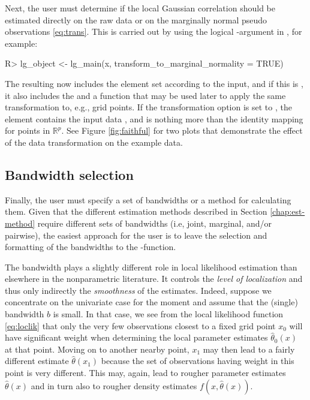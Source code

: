 Next, the user must determine if the local Gaussian correlation should be estimated directly on the raw data or on the marginally normal pseudo observations \eqref{eq:trans}. This is carried out by using the logical -argument in , for example:

\begin{example}
R> lg_object <- lg_main(x, transform_to_marginal_normality = TRUE)
\end{example}

The resulting  now includes the element  set according to the input, and if this is , it also includes the  and a function  that may be used later to apply the same transformation to, e.g., grid points. If the transformation option is set to , the  element contains the input data , and  is nothing more than the identity mapping for points in \(\mathbb{R}^p\). See Figure \ref{fig:faithful} for two plots that demonstrate the effect of the data transformation on the example data.

\subsection{Bandwidth selection}\label{chap:bw}

Finally, the user must specify a set of bandwidths or a method for calculating them. Given that the different estimation methods described in Section \ref{chap:est-method} require different sets of bandwidths (i.e, joint, marginal, and/or pairwise), the easiest approach for the user is to leave the selection and formatting of the bandwidths to the -function.

The bandwidth plays a slightly different role in local likelihood estimation than elsewhere in the nonparametric literature. It controls the \emph{level of localization} and thus only indirectly the \emph{smoothness} of the estimates. Indeed, suppose we concentrate on the univariate case for the moment and assume that the (single) bandwidth \(b\) is small. In that case, we see from the local likelihood function \eqref{eq:loclik} that only the very few observations closest to a fixed grid point \(x_0\) will have significant weight when determining the
local parameter estimates \(\widehat\theta_0\left(x\right)\) at that point. Moving on to another nearby point, \(x_1\) may then lead to a fairly different estimate \(\widehat\theta\left(x_1\right)\) because the set of observations having weight in this point is very different. This may, again, lead to rougher parameter estimates \(\widehat\theta\left(x\right)\) and in turn also to rougher density estimates \(f\left(x,\widehat\theta\left(x\right)\right)\).

